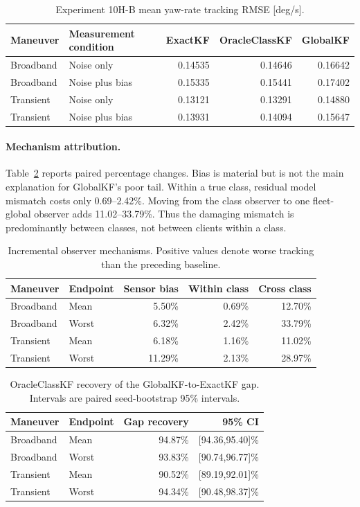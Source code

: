 \begin{table}[htbp]
\centering
\caption{Experiment 10H-B mean yaw-rate tracking RMSE [deg/s].}
\label{tab:experiment10hb-performance}
\begin{tabular}{llrrr}
\toprule
Maneuver & Measurement condition & ExactKF & OracleClassKF & GlobalKF\\
\midrule
Broadband & Noise only       & 0.14535 & 0.14646 & 0.16642\\
Broadband & Noise plus bias  & 0.15335 & 0.15441 & 0.17402\\
Transient & Noise only       & 0.13121 & 0.13291 & 0.14880\\
Transient & Noise plus bias  & 0.13931 & 0.14094 & 0.15647\\
\bottomrule
\end{tabular}
\end{table}

\paragraph{Mechanism attribution.}
Table~\ref{tab:experiment10hb-mechanisms} reports paired percentage changes.
Bias is material but is not the main explanation for GlobalKF's poor tail.
Within a true class, residual model mismatch costs only 0.69--2.42\%. Moving
from the class observer to one fleet-global observer adds 11.02--33.79\%.
Thus the damaging mismatch is predominantly between classes, not between
clients within a class.

\begin{table}[htbp]
\centering
\caption{Incremental observer mechanisms. Positive values denote worse
tracking than the preceding baseline.}
\label{tab:experiment10hb-mechanisms}
\begin{tabular}{llrrr}
\toprule
Maneuver & Endpoint & Sensor bias & Within class & Cross class\\
\midrule
Broadband & Mean  & 5.50\% & 0.69\% & 12.70\%\\
Broadband & Worst & 6.32\% & 2.42\% & 33.79\%\\
Transient & Mean  & 6.18\% & 1.16\% & 11.02\%\\
Transient & Worst & 11.29\% & 2.13\% & 28.97\%\\
\bottomrule
\end{tabular}
\end{table}

\begin{table}[htbp]
\centering
\caption{OracleClassKF recovery of the GlobalKF-to-ExactKF gap. Intervals are
paired seed-bootstrap 95\% intervals.}
\label{tab:experiment10hb-recovery}
\begin{tabular}{llrr}
\toprule
Maneuver & Endpoint & Gap recovery & 95\% CI\\
\midrule
Broadband & Mean  & 94.87\% & [94.36,95.40]\%\\
Broadband & Worst & 93.83\% & [90.74,96.77]\%\\
Transient & Mean  & 90.52\% & [89.19,92.01]\%\\
Transient & Worst & 94.34\% & [90.48,98.37]\%\\
\bottomrule
\end{tabular}
\end{table}


